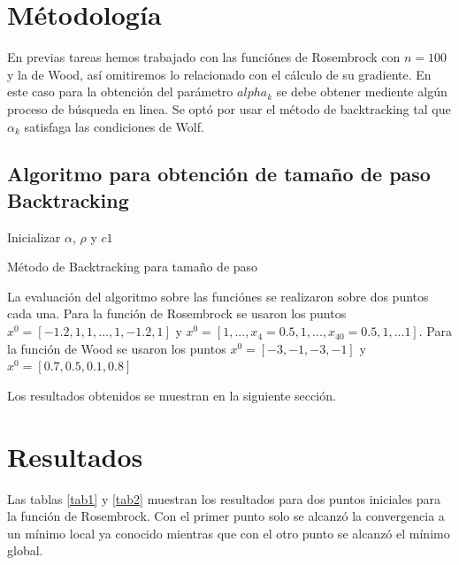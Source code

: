 \documentclass[conference]{IEEEtran}
\begin{document}
\section{Métodología}

En previas tareas hemos trabajado con las funciónes de Rosembrock con $n=100$ y la de Wood,
así omitiremos lo relacionado con el cálculo de su gradiente. En este caso para la obtención del
parámetro $alpha_k$ se debe obtener mediente algún proceso de búsqueda en linea. Se optó por usar
el método de backtracking tal que $\alpha_k$ satisfaga las condiciones de Wolf.

\subsection{Algoritmo para obtención de tamaño de paso Backtracking}

\begin{algorithm}[]
	\SetAlgoLined
	\KwResult{$\alpha$}
	Inicializar $\alpha$, $\rho$ y $c1$ \\
	 \caption{Método de Backtracking para tamaño de paso}
\end{algorithm}

La evaluación del algoritmo sobre las funciónes se realizaron sobre dos puntos cada una. Para la
función de Rosembrock se usaron los puntos $x^0 = [-1.2, 1, 1, \dots , 1, -1.2, 1]$ y
$x^0 = [1,..., x_4=0.5,1,...,x_40=0.5, 1,...1]$. Para la función de Wood se usaron los puntos
$x^0 = [-3, -1, -3, -1]$ y $x^0 = [0.7, 0.5, 0.1, 0.8]$

Los resultados obtenidos se muestran en la siguiente sección.

\section{Resultados}

Las tablas \ref{tab1} y \ref{tab2} muestran los resultados para dos puntos iniciales para la función
de Rosembrock. Con el primer punto solo se alcanzó la convergencia a un mínimo local ya conocido
mientras que con el otro punto se alcanzó el mínimo global.
\end{document}

